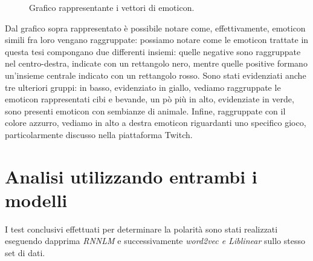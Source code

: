 \documentclass[a4paper,12pt,openright,twoside]{report}
\theoremstyle{definition}
\begin{document}
\begin{figure}[H]
	\centering
	\caption{Grafico rappresentante i vettori di emoticon.}
	\label{fig:tSNE}
\end{figure}

Dal grafico sopra rappresentato è possibile notare come, effettivamente, emoticon simili fra loro vengano raggruppate:
possiamo notare come le emoticon trattate in questa tesi compongano due differenti insiemi: quelle negative sono raggruppate nel centro-destra, indicate con un rettangolo nero, mentre quelle positive formano un'insieme centrale indicato con un rettangolo rosso.
Sono stati evidenziati anche tre ulteriori gruppi: in basso, evidenziato in giallo, vediamo raggruppate le emoticon rappresentati cibi e bevande,
un pò più in alto, evidenziate in verde, sono presenti emoticon con sembianze di animale. Infine, raggruppate con il colore azzurro, vediamo in alto a destra emoticon riguardanti uno specifico gioco, particolarmente discusso nella piattaforma Twitch.


\section{Analisi utilizzando entrambi i modelli}
I test conclusivi effettuati per determinare la polarità
sono stati realizzati eseguendo dapprima \emph{RNNLM} e successivamente \emph{word2vec e Liblinear} sullo stesso set di dati.
\end{document}
